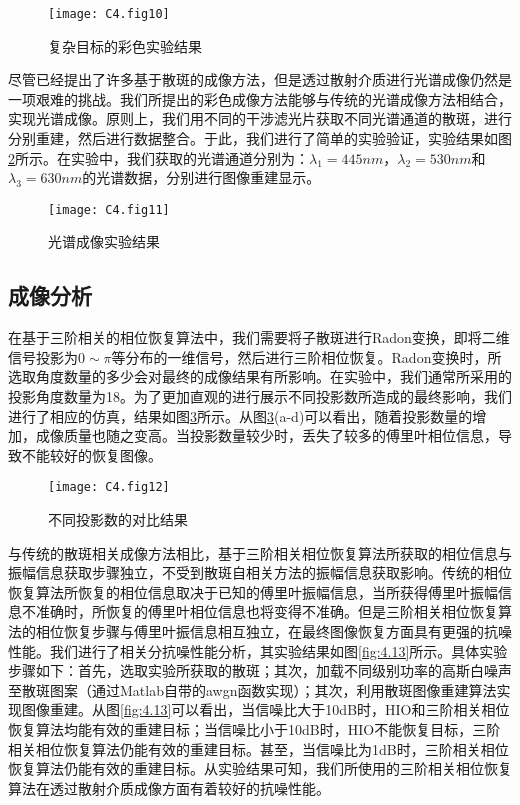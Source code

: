 \begin{figure}[htp]
	\centering
	\texttt{[image: C4.fig10]}
	\caption{复杂目标的彩色实验结果}
	\label{fig:4.10}
\end{figure}

尽管已经提出了许多基于散斑的成像方法，但是透过散射介质进行光谱成像仍然是一项艰难的挑战。我们所提出的彩色成像方法能够与传统的光谱成像方法相结合，实现光谱成像。原则上，我们用不同的干涉滤光片获取不同光谱通道的散斑，进行分别重建，然后进行数据整合。于此，我们进行了简单的实验验证，实验结果如图\ref{fig:4.11}所示。在实验中，我们获取的光谱通道分别为：$\lambda_1 =445nm$，$\lambda_2  =530nm$和$\lambda_3  =630nm$的光谱数据，分别进行图像重建显示。

\begin{figure}[htp]
	\centering
	\texttt{[image: C4.fig11]}
	\caption{光谱成像实验结果}
	\label{fig:4.11}
\end{figure}

\subsection{成像分析}

在基于三阶相关的相位恢复算法中，我们需要将子散斑进行Radon变换，即将二维信号投影为$0\sim \pi$等分布的一维信号，然后进行三阶相位恢复。Radon变换时，所选取角度数量的多少会对最终的成像结果有所影响。在实验中，我们通常所采用的投影角度数量为18。为了更加直观的进行展示不同投影数所造成的最终影响，我们进行了相应的仿真，结果如图\ref{fig:4.12}所示。从图\ref{fig:4.12}(a-d)可以看出，随着投影数量的增加，成像质量也随之变高。当投影数量较少时，丢失了较多的傅里叶相位信息，导致不能较好的恢复图像。

\begin{figure}[htp]
	\centering
	\texttt{[image: C4.fig12]}
	\caption{不同投影数的对比结果}
	\label{fig:4.12}
\end{figure}

与传统的散斑相关成像方法相比，基于三阶相关相位恢复算法所获取的相位信息与振幅信息获取步骤独立，不受到散斑自相关方法的振幅信息获取影响。传统的相位恢复算法所恢复的相位信息取决于已知的傅里叶振幅信息，当所获得傅里叶振幅信息不准确时，所恢复的傅里叶相位信息也将变得不准确。但是三阶相关相位恢复算法的相位恢复步骤与傅里叶振信息相互独立，在最终图像恢复方面具有更强的抗噪性能。我们进行了相关分抗噪性能分析，其实验结果如图\ref{fig:4.13}所示。具体实验步骤如下：首先，选取实验所获取的散斑；其次，加载不同级别功率的高斯白噪声至散斑图案（通过Matlab自带的awgn函数实现）；其次，利用散斑图像重建算法实现图像重建。从图\ref{fig:4.13}可以看出，当信噪比大于10dB时，HIO和三阶相关相位恢复算法均能有效的重建目标；当信噪比小于10dB时，HIO不能恢复目标，三阶相关相位恢复算法仍能有效的重建目标。甚至，当信噪比为1dB时，三阶相关相位恢复算法仍能有效的重建目标。从实验结果可知，我们所使用的三阶相关相位恢复算法在透过散射介质成像方面有着较好的抗噪性能。

